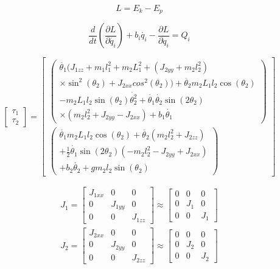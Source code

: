 \begin{equation}
L=E_k-E_p
\end{equation}

\begin{equation}
\frac{d}{dt}(\frac{\partial L}{\partial\dot{q_i}})+b_i\dot{q_i}-\frac{\partial L}{\partial q_i}=Q_i
\end{equation}

\begin{equation}
\begin{bmatrix}
\tau_1 \\
\tau_2
\end{bmatrix}
=
\begin{bmatrix}
\begin{pmatrix}
\ddot{\theta_1}(J_{1zz}+m_1l^2_1+m_2L^2_1+(J_{2yy}+m_2l^2_2) 						\\
\times \sin^2(\theta_2)+J_{2xx}cos^2(\theta_2))+\ddot{\theta_2}m_2L_1l_2\cos(\theta_2)			\\
-m_2L_1l_2\sin(\theta_2)\dot{\theta^2_2}+\dot{\theta_1}\dot{\theta_2}\sin(2\theta_2)	\\
\times(m_2l^2_2+J_{2yy}-J_{2xx})+b_1\dot{\theta_1}
\end{pmatrix}
\\
\begin{pmatrix}
\ddot{\theta_1}m_2L_1l_2\cos(\theta_2)+\ddot{\theta_2}(m_2l^2_2+J_{2zz})	\\
+\frac{1}{2}\dot{\theta_1}\sin(2\theta_2)(-m_2l^2_2-J_{2yy}+J_{2xx})						\\
+b_2\dot{\theta_2}+gm_2l_2\sin(\theta_2)
\end{pmatrix}
\end{bmatrix}
\end{equation}

\begin{eqnarray}
J_1=
\begin{bmatrix}
J_{1xx} & 0 & 0\\
0 & J_{1yy} & 0\\
0 & 0 & J_{1zz}
\end{bmatrix}
\approx
\begin{bmatrix}
0 & 0 & 0\\
0 & J_{1} & 0\\
0 & 0 & J_{1}
\end{bmatrix}
\nonumber \\
J_2=
\begin{bmatrix}
J_{2xx} & 0 & 0\\
0 & J_{2yy} & 0\\
0 & 0 & J_{2zz}
\end{bmatrix}
\approx
\begin{bmatrix}
0 & 0 & 0\\
0 & J_{2} & 0\\
0 & 0 & J_{2}
\end{bmatrix}
\end{eqnarray}


